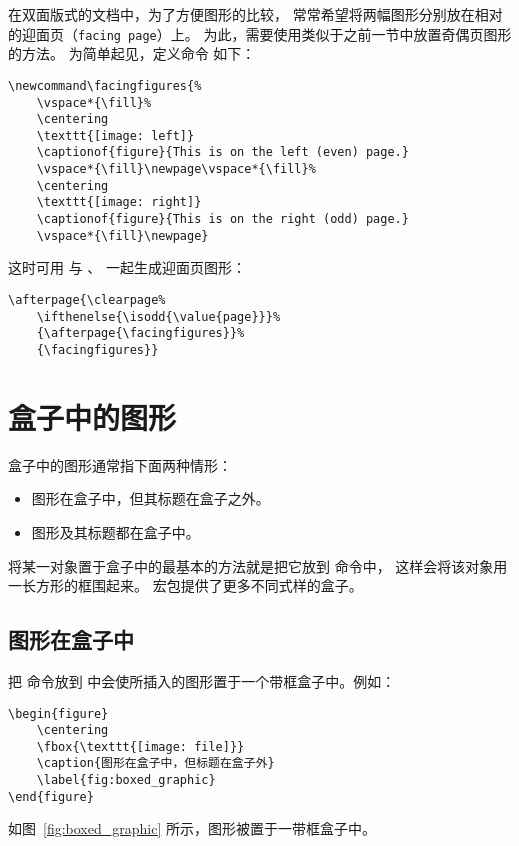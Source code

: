 在双面版式的文档中，为了方便图形的比较，
常常希望将两幅图形分别放在相对的迎面页（\texttt{facing page}）上。
为此，需要使用类似于之前一节中放置奇偶页图形的方法。
为简单起见，定义命令  如下：
\begin{lstlisting}
\newcommand\facingfigures{%
	\vspace*{\fill}%
	\centering
	\texttt{[image: left]}
	\captionof{figure}{This is on the left (even) page.}
	\vspace*{\fill}\newpage\vspace*{\fill}%
	\centering
	\texttt{[image: right]}
	\captionof{figure}{This is on the right (odd) page.}
	\vspace*{\fill}\newpage}
\end{lstlisting}

这时可用  与 、 一起生成迎面页图形：
\begin{lstlisting}
\afterpage{\clearpage%
	\ifthenelse{\isodd{\value{page}}}%
	{\afterpage{\facingfigures}}%
	{\facingfigures}}
\end{lstlisting}


\section{盒子中的图形}\label{sec:boxfig}

盒子中的图形通常指下面两种情形：
\begin{itemize}
	\item 图形在盒子中，但其标题在盒子之外。
	\item 图形及其标题都在盒子中。
\end{itemize}

将某一对象置于盒子中的最基本的方法就是把它放到  命令中，
这样会将该对象用一长方形的框围起来。
 宏包提供了更多不同式样的盒子。


\subsection{图形在盒子中}\label{ssec:boxgraphic}

把  命令放到  中会使所插入的图形置于一个带框盒子中。例如：
\begin{lstlisting}
\begin{figure}
	\centering
	\fbox{\texttt{[image: file]}}
	\caption{图形在盒子中，但标题在盒子外}
	\label{fig:boxed_graphic}
\end{figure}
\end{lstlisting}
如图~\ref{fig:boxed_graphic} 所示，图形被置于一带框盒子中。


